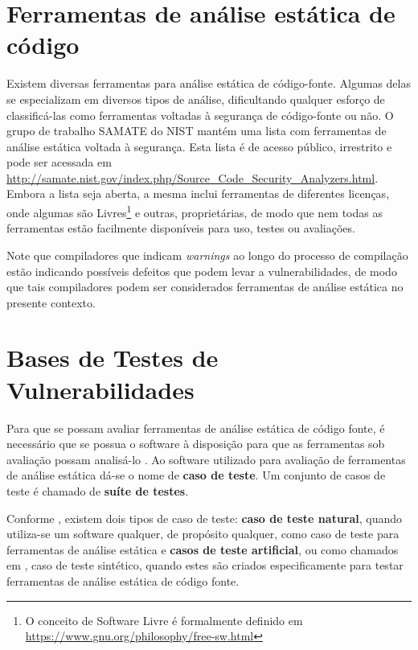   \section{Ferramentas de análise estática de código}

  Existem diversas ferramentas para análise estática de código-fonte. Algumas delas se especializam em diversos tipos de análise, dificultando qualquer esforço de classificá-las como ferramentas voltadas à segurança de código-fonte ou não. O grupo de trabalho SAMATE do  NIST mantém uma lista com ferramentas de análise estática voltada à segurança. Esta lista é de acesso público, irrestrito e pode ser acessada em \url{http://samate.nist.gov/index.php/Source_Code_Security_Analyzers.html}. Embora a lista seja aberta, a mesma inclui ferramentas de diferentes licenças, onde algumas são Livres\footnote{O conceito de Software Livre é formalmente definido em \url{https://www.gnu.org/philosophy/free-sw.html}} e outras, proprietárias, de modo que nem todas as ferramentas estão facilmente disponíveis para uso, testes ou avaliações.

  Note que compiladores que indicam \textit{warnings} ao longo do processo de compilação estão indicando possíveis defeitos que podem levar a vulnerabilidades, de modo que tais compiladores podem ser considerados ferramentas de análise estática no presente contexto.


  \section{Bases de Testes de Vulnerabilidades}\label{fundamentacao_teorica:bases_de_testes_de_vulnerabilidade}

  Para que se possam avaliar ferramentas de análise estática de código fonte, é necessário que se possua o software à disposição para que as ferramentas sob avaliação possam analisá-lo \cite{nsa}. Ao software utilizado para avaliação de ferramentas de análise estática dá-se o nome de \textbf{caso de teste}. Um conjunto de casos de teste é chamado de \textbf{suíte de testes}.

  Conforme \cite{nsa}, existem dois tipos de caso de teste: \textbf{caso de teste natural}, quando utiliza-se um software qualquer, de propósito qualquer, como caso de teste para ferramentas de análise estática e \textbf{casos de teste artificial}, ou como chamados em \cite {juliet}, caso de teste sintético, quando estes são criados especificamente para testar ferramentas de análise estática de código fonte.

